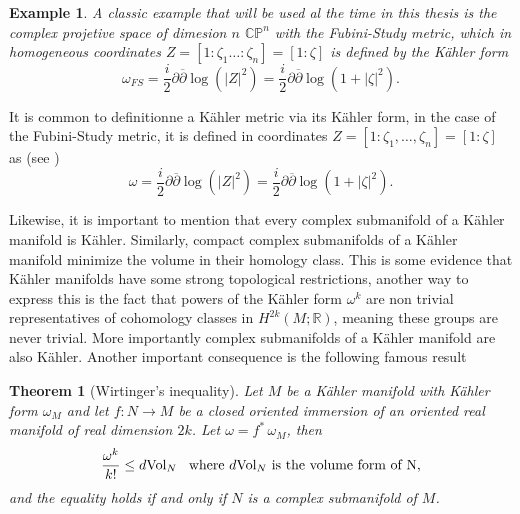 \documentclass[12pt,twoside,a4paper]{report}
\newtheorem{theorem}{Theorem}[section]
\newtheorem{example}{Example}
\newcommand{\cp}{\ensuremath{\mathbb{CP}}}
\newcommand{\re}{\ensuremath{\mathbb R }}
\begin{document}
\begin{example}
  A classic example that will be used al the time in this thesis is the complex projetive space of dimesion $n$ $\cp^{n}$ with the Fubini-Study metric, which in homogeneous coordinates $Z=[1:\zeta_{1}\dots:\zeta_{n}]=[1:\zeta]$ is defined by the Kähler form
  \[
    \omega_{FS}=\frac{i}{2}\partial \overline{\partial}\log(|Z|^{2})=\frac{i}{2}\partial \overline{\partial}\log(1+|\zeta|^{2}).
  \]
\end{example}

It is common to definitionne a K\"ahler metric via its K\"ahler form, in the case of the Fubini-Study metric, it is defined in coordinates $Z=[1:\zeta_{1},\dots,\zeta_{n}]=[1:\zeta]$ as (see \cite[p. 154]{Chirka})
\[
    \omega=\frac{i}{2}\partial\overline{\partial}\log(|Z|^{2})=\frac{i}{2}\partial\overline{\partial}\log(1+|\zeta|^{2}).
\]

Likewise, it is important to mention that every complex submanifold of a K\"ahler manifold is K\"ahler. Similarly, compact complex submanifolds of a K\"ahler manifold minimize the volume in their homology class. This is some evidence that Kähler manifolds have some strong topological restrictions, another way to express this is the fact that powers of the Kähler form $\omega^k$ are non trivial representatives of cohomology classes in $H^{2k}(M ;\re)$, meaning these groups are never trivial. More importantly complex submanifolds of a Kähler manifold are also K\"ahler.
Another important consequence is the following famous result
\begin{theorem}[Wirtinger's inequality]
        Let $M$ be a Kähler manifold with Kähler form $\omega_M$ and let $f:N\rightarrow M$ be a closed oriented immersion
        of an oriented real manifold of real dimension $2k$. Let $\omega=f^*\,\omega_M$, then
        \begin{equation}
                        \frac{\omega^k}{k!}\leq d\textrm{Vol}_N\hspace{0.3cm}\text{where }d\textrm{Vol}_N\text{ is the volume form of N,}
        \end{equation}
        and the equality holds if and only if $N$ is a complex submanifold of $M$.
\end{theorem}
\end{document}
